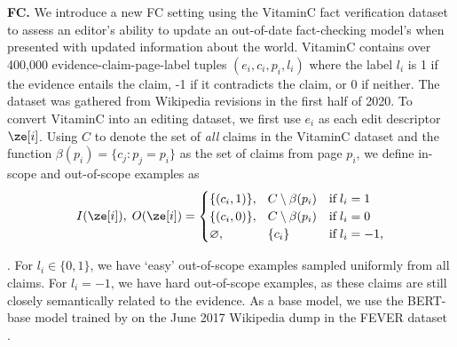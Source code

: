 \textbf{FC.} We introduce a new FC setting using the VitaminC fact verification dataset \citep{schuster-etal-2021-get} to assess an editor's ability to update an out-of-date fact-checking model's when presented with updated information about the world. VitaminC contains over 400,000 evidence-claim-page-label tuples $(e_i, c_i, p_i, l_i)$ where the label $l_i$ is 1 if the evidence entails the claim, -1 if it contradicts the claim, or 0 if neither. The dataset was gathered from Wikipedia revisions in the first half of 2020. To convert VitaminC into an editing dataset, we first use $e_i$ as each edit descriptor $\ze[i]$. Using $C$ to denote the set of \textit{all} claims in the VitaminC dataset and the function $\beta(p_i)=\{c_j : p_j = p_i\}$ as the set of claims from page $p_i$, we define in-scope and out-of-scope examples as
\begin{equation*}
    I(\ze[i]),\;O(\ze[i]) = \begin{cases}
        \{(c_i, 1)\},\phantom{\varnothing} C \setminus \beta(p_i) & \text{if}\;l_i = 1 \\
        \{(c_i, 0)\},\phantom{\varnothing} C \setminus \beta(p_i) & \text{if}\;l_i = 0 \\
        \varnothing,\phantom{\{(c_i, 0)\}} \{c_i\} & \text{if}\;l_i = -1,
    \end{cases}
\end{equation*}

. For $l_i \in \{0,1\}$, we have `easy' out-of-scope examples sampled uniformly from all claims. For $l_i=-1$, we have hard out-of-scope examples, as these claims are still closely semantically related to the evidence. As a base model, we use the BERT-base model trained by \citet{Cao2021EditingFK} on the June 2017 Wikipedia dump in the FEVER dataset \citep{Thorne18Fever}.



